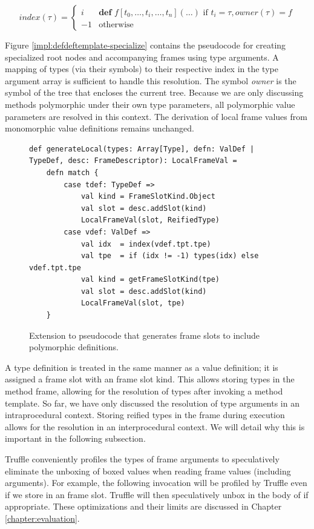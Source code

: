 $$
index(\tau) = 
\begin{cases}
	i  & \textbf{def } f[t_0, \ldots, t_i, \ldots, t_n](\ldots) \text{ if } t_i = \tau, owner(\tau)=f \\
	-1 & \text{otherwise}
\end{cases}
$$

Figure \ref{impl:defdeftemplate-specialize} contains the pseudocode for creating specialized root nodes and accompanying frames using type arguments.
A mapping of types (via their symbols) to their respective index in the type argument array is sufficient to handle this resolution.
The symbol \textit{owner} is the symbol of the tree that encloses the current tree.
Because we are only discussing methods polymorphic under their own type parameters, all polymorphic value parameters are resolved in this context.
The derivation of local frame values from monomorphic value definitions remains unchanged. 

\begin{figure}[!htb]
\begin{verbatim}
def generateLocal(types: Array[Type], defn: ValDef | TypeDef, desc: FrameDescriptor): LocalFrameVal = 
	defn match {
		case tdef: TypeDef => 
			val kind = FrameSlotKind.Object
			val slot = desc.addSlot(kind)
			LocalFrameVal(slot, ReifiedType)
		case vdef: ValDef => 
			val idx  = index(vdef.tpt.tpe)
			val tpe  = if (idx != -1) types(idx) else vdef.tpt.tpe
			val kind = getFrameSlotKind(tpe)
			val slot = desc.addSlot(kind)
			LocalFrameVal(slot, tpe)
	}
\end{verbatim}
\caption{Extension to pseudocode that generates frame slots to include polymorphic definitions.}
\label{impl:gen-poly-locals}
\end{figure}

A type definition is treated in the same manner as a value definition; it is assigned a frame slot with an  frame slot kind.
This allows storing types in the method frame, allowing for the resolution of types after invoking a method template.
So far, we have only discussed the resolution of type arguments in an intraprocedural context.
Storing reified types in the frame during execution allows for the resolution in an interprocedural context.
We will detail why this is important in the following subsection.

Truffle conveniently profiles the types of frame arguments to speculatively eliminate the unboxing of boxed values when reading frame values (including arguments). 
For example, the following invocation  will be profiled by Truffle even if we store  in an  frame slot.
Truffle will then speculatively unbox  in the body of  if appropriate.
These optimizations and their limits are discussed in Chapter \ref{chapter:evaluation}.

